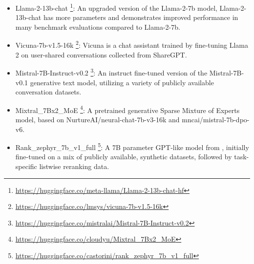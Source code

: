 \documentclass[sigconf,natbib=true,anonymous=false]{acmart}
\begin{document}

\begin{itemize}
    \item Llama-2-13b-chat \footnote{\url{https://huggingface.co/meta-llama/Llama-2-13b-chat-hf}}: An upgraded version of the Llama-2-7b model, Llama-2-13b-chat has more parameters and demonstrates improved performance in many benchmark evaluations compared to Llama-2-7b.
    
    \item Vicuna-7b-v1.5-16k \footnote{\url{https://huggingface.co/lmsys/vicuna-7b-v1.5-16k}}: Vicuna is a chat assistant trained by fine-tuning Llama 2 on user-shared conversations collected from ShareGPT.
    
    \item Mistral-7B-Instruct-v0.2 \footnote{\url{https://huggingface.co/mistralai/Mistral-7B-Instruct-v0.2}}: An instruct fine-tuned version of the Mistral-7B-v0.1 generative text model, utilizing a variety of publicly available conversation datasets.

    \item Mixtral\_7Bx2\_MoE \footnote{\url{https://huggingface.co/cloudyu/Mixtral_7Bx2_MoE}}: A pretrained generative Sparse Mixture of Experts model, based on NurtureAI/neural-chat-7b-v3-16k and mncai/mistral-7b-dpo-v6.

    \item Rank\_zephyr\_7b\_v1\_full \footnote{\url{https://huggingface.co/castorini/rank_zephyr_7b_v1_full}}: A 7B parameter GPT-like model from \cite{DBLP:journals/corr/abs-2312-02724}, initially fine-tuned on a mix of publicly available, synthetic datasets, followed by task-specific listwise reranking data.
\end{itemize}
\end{document}
